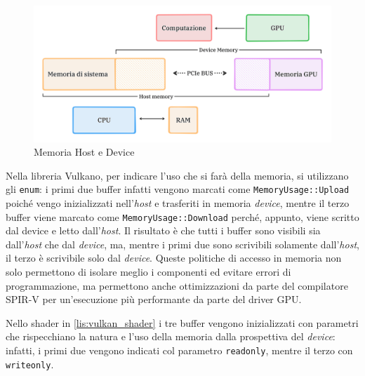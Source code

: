 \begin{figure}[ht]
    \centering
    \includegraphics[width=.9\linewidth]{images/chapter2/host_device_mem.png}
    \caption{Memoria Host e Device}
    \label{fig:host_device_mem}
\end{figure}

Nella libreria Vulkano, per indicare l'uso che si farà della memoria, si utilizzano gli \verb|enum|: i primi due buffer infatti vengono marcati come \verb|MemoryUsage::Upload| poiché vengo inizializzati nell'\textit{host} e trasferiti in memoria \textit{device}, mentre il terzo buffer viene marcato come \verb|MemoryUsage::Download| perché, appunto, viene scritto dal device e letto dall'\textit{host}. Il risultato è che tutti i buffer sono visibili sia dall'\textit{host} che dal \textit{device}, ma, mentre i primi due sono scrivibili solamente dall'\textit{host}, il terzo è scrivibile solo dal \textit{device}. Queste politiche di accesso in memoria non solo permettono di isolare meglio i componenti ed evitare errori di programmazione, ma permettono anche ottimizzazioni da parte del compilatore \gls{SPIR-V} per un'esecuzione più performante da parte del driver \gls{GPU}.

Nello shader in \ref{lis:vulkan_shader} i tre buffer vengono inizializzati con parametri che rispecchiano la natura e l'uso della memoria dalla prospettiva del \textit{device}: infatti, i primi due vengono indicati col parametro \verb|readonly|, mentre il terzo con \verb|writeonly|.


